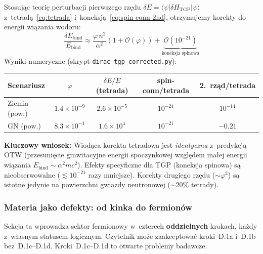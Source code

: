 \begin{proposition}%
\label{prop:dirac-perturbative}
Stosuj\k{a}c teori\k{e} perturbacji pierwszego rz\k{e}du
$\delta E = \langle\psi|\delta H_{\mathrm{TGP}}|\psi\rangle$
z~tetrad\k{a}~\eqref{eq:tetrada} i~koneksj\k{a}~\eqref{eq:spin-conn-2nd},
otrzymujemy korekty do energii wi\k{a}zania wodoru:
\begin{equation}\label{eq:dirac-perturbative-result}
  \boxed{
    \frac{\delta E_{\mathrm{bind}}}{E_{\mathrm{bind}}}
    \approx \frac{\varphi \, n^2}{\alpha^2}
    \left(1 + \mathcal{O}(\varphi)\right)
    + \underbrace{\mathcal{O}(10^{-21})}_{\text{koneksja spinowa}}
  }
\end{equation}
Wyniki numeryczne (skrypt \texttt{dirac\_tgp\_corrected.py}):
\begin{center}
\begin{tabular}{lcccc}
\toprule
  Scenariusz & $\varphi$ & $\delta E/E$ (tetrada) &
  spin-conn/tetrada & 2.~rz\k{a}d/tetrada \\
\midrule
  Ziemia (pow.) & $1.4\times 10^{-9}$
    & $2.6\times 10^{-5}$ & $10^{-24}$ & $10^{-14}$ \\
  GN (pow.) & $8.3\times 10^{-1}$
    & $1.6\times 10^{4}$ & $10^{-21}$ & $-0.21$ \\
\bottomrule
\end{tabular}
\end{center}
\textbf{Kluczowy wniosek:}
Wiod\k{a}ca korekta tetradowa jest \emph{identyczna} z~predykcj\k{a}
OTW (przesuni\k{e}cie grawitacyjne energii spoczynkowej wzgl\k{e}dem
ma\l{}ej energii wi\k{a}zania $E_{\mathrm{bind}} \sim \alpha^2 mc^2$).
Efekty specyficzne dla TGP (koneksja spinowa) s\k{a} nieobserwowalne
($\lesssim 10^{-21}$ razy mniejsze).
Korekty drugiego rz\k{e}du ($\sim\varphi^2$) s\k{a} istotne
jedynie na powierzchni gwiazdy neutronowej ($\sim 20\%$ tetrady).
\end{proposition}

\subsubsection{Materia jako defekty: od kinka do fermion\'ow}

\begin{remark}\label{rem:fermion-4-steps}
Sekcja ta wprowadza sektor fermionowy w~czterech \textbf{oddzielnych} krokach,
ka\.zdy z~w\l{}asnym statusem logicznym. Czytelnik mo\.ze zaakceptowa\'c
kroki~D.1a i~D.1b bez~D.1c--D.1d. Kroki~D.1c--D.1d to otwarte problemy badawcze.
\end{remark}

